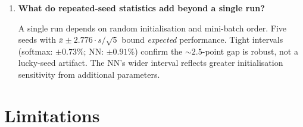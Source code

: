 \documentclass[sigconf,screen,nonacm]{acmart}
\newcommand{\1}{\mathbf{1}}
\begin{document}
\begin{enumerate}[leftmargin=*]
The $H{=}2$ bottleneck teaches that \emph{capacity is a prerequisite that
optimisation cannot substitute}.  Identical optimiser settings yield 58.97\,\%
($H{=}2$) versus 95.71\,\% ($H{=}32$).  This distinguishes three failure modes:
\begin{itemize}[leftmargin=*]
  \item \emph{Optimisation failure}: architecture can represent a solution,
        optimiser cannot find it.
  \item \emph{Capacity failure}: architecture \emph{cannot} represent a
        solution. $\leftarrow$ this case.
  \item \emph{Generalisation failure}: model fits training but not test data.
\end{itemize}
The $H{=}2$ case is pure capacity failure: increasing $H$ expands the
hypothesis class, not the optimiser's effectiveness.

\item \textbf{What do repeated-seed statistics add beyond a single run?}

A single run depends on random initialisation and mini-batch order.  Five seeds
with $\bar{x}\pm 2.776\cdot s/\!\sqrt{5}$ bound \emph{expected} performance.
Tight intervals (softmax: $\pm 0.73\%$; NN: $\pm 0.91\%$) confirm the
${\sim}2.5$-point gap is robust, not a lucky-seed artifact.  The NN's wider
interval reflects greater initialisation sensitivity from additional parameters.

\end{enumerate}

\section{Limitations}
\label{sec:limitations}
\end{document}
